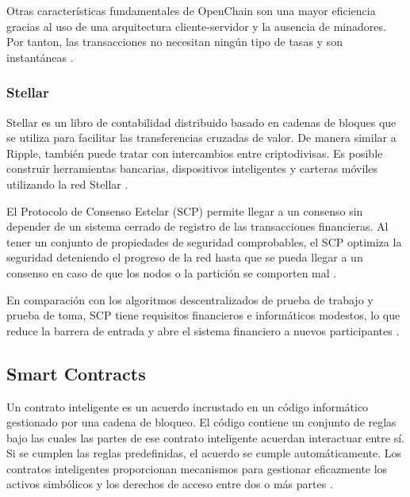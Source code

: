 \vspace{5mm}

\noindent Otras características fundamentales de OpenChain son una mayor eficiencia gracias al uso de una arquitectura 
cliente-servidor y la ausencia de minadores. Por tanton, las transacciones no necesitan ningún tipo de tasas y son 
instantáneas \cite{top-blockchain-platforms-app2}.

\subsubsection*{Stellar}

Stellar es un libro de contabilidad distribuido basado en cadenas de bloques que se utiliza para facilitar las 
transferencias cruzadas de valor. De manera similar a Ripple, también puede tratar con intercambios entre 
criptodivisas. Es posible construir herramientas bancarias, dispositivos inteligentes y carteras móviles utilizando 
la red Stellar \cite{top-blockchain-platforms-app2}.

\vspace{5mm}

\noindent El Protocolo de Consenso Estelar (SCP) permite llegar a un consenso sin depender de un sistema cerrado de 
registro de las transacciones financieras. Al tener un conjunto de propiedades de seguridad comprobables, el SCP 
optimiza la seguridad deteniendo el progreso de la red hasta que se pueda llegar a un consenso en caso de que los nodos 
o la partición se comporten mal \cite{top-blockchain-platforms-app2}.

\vspace{5mm}

\noindent En comparación con los algoritmos descentralizados de prueba de trabajo y prueba de toma, SCP tiene 
requisitos financieros e informáticos modestos, lo que reduce la barrera de entrada y abre el sistema financiero a 
nuevos participantes \cite{top-blockchain-platforms, top-blockchain-platforms-app2}.

\subsection{Smart Contracts}

Un contrato inteligente es un acuerdo incrustado en un código informático gestionado por una cadena de bloqueo. El 
código contiene un conjunto de reglas bajo las cuales las partes de ese contrato inteligente acuerdan interactuar entre 
sí. Si se cumplen las reglas predefinidas, el acuerdo se cumple automáticamente. Los contratos inteligentes 
proporcionan mecanismos para gestionar eficazmente los activos simbólicos y los derechos de acceso entre dos o más 
partes \cite{what-is-smart-contract}. 

